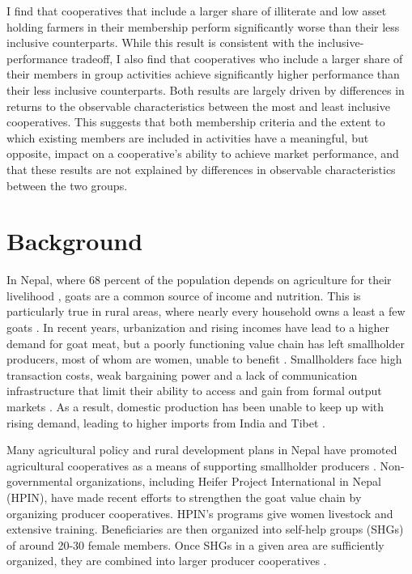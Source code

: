 \documentclass[11pt]{article}
\begin{document}
I find that cooperatives that include a larger share of illiterate and low asset holding farmers in their membership perform significantly worse than their less inclusive counterparts. While this result is consistent with the inclusive-performance tradeoff, I also find that cooperatives who include a larger share of their members in group activities achieve significantly higher performance than their less inclusive counterparts. Both results are largely driven by differences in returns to the observable characteristics between the most and least inclusive cooperatives. This suggests that both membership criteria and the extent to which existing members are included in activities have a meaningful, but opposite, impact on a cooperative's ability to achieve market performance, and that these results are not explained by differences in observable characteristics between the two groups. %


\section{Background} \label{sec:background}

In Nepal, where 68 percent of the population depends on agriculture for their livelihood %
\citep{international_labor_organization_ilo_2016}, goats are a common source of income and nutrition. This is particularly true in rural areas, where nearly every household owns a least a few goats \citep{upreti_food_2009}. In recent years, urbanization and rising incomes have lead to a higher demand for goat meat, but a poorly functioning value chain has left smallholder producers, most of whom are women, unable to benefit \citep{ashby_investing_nodate,choudhary_pro-poor_2011,gurung_empowering_2015}. Smallholders face high transaction costs, weak bargaining power and a lack of communication infrastructure that limit their ability to access and gain from formal output markets \citep{ashby_investing_nodate,p_kristjanson_notitle_2014}. As a result, domestic production has been unable to keep up with rising demand, leading to higher imports from India and Tibet \citep{heifer_international_nepal_study_2012}.

Many agricultural policy and rural development plans in Nepal have promoted agricultural cooperatives as a means of supporting smallholder producers \citep{agricultural_development_strategy_agricultural_2015}. Non-governmental organizations, including Heifer Project International in Nepal (HPIN), have made recent efforts to strengthen the goat value chain by organizing producer cooperatives. HPIN’s programs give women livestock and extensive training. Beneficiaries are then organized into self-help groups (SHGs) of around 20-30 female members. Once SHGs in a given area are sufficiently organized, they are combined into larger producer cooperatives \citep{janzen_short-term_2018}.
\end{document}

